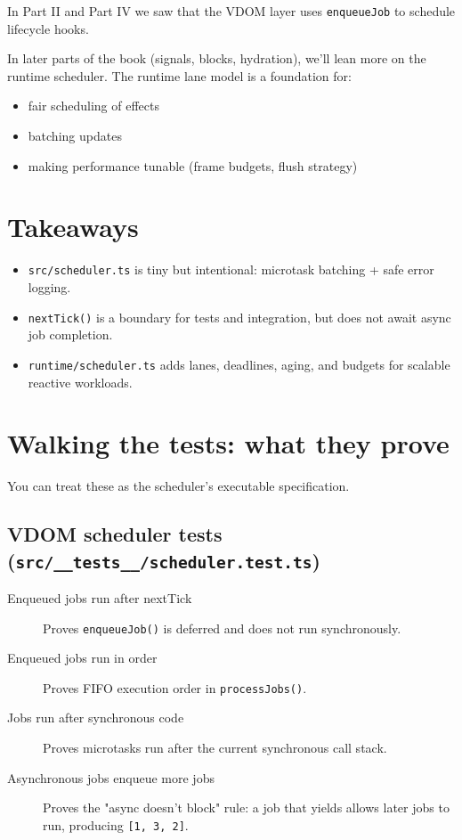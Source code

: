 In Part II and Part IV we saw that the VDOM layer uses \texttt{enqueueJob} to schedule lifecycle hooks.

In later parts of the book (signals, blocks, hydration), we’ll lean more on the runtime scheduler.
The runtime lane model is a foundation for:

\begin{itemize}
  \item fair scheduling of effects
  \item batching updates
  \item making performance tunable (frame budgets, flush strategy)
\end{itemize}

\section{Takeaways}

\begin{itemize}
  \item \texttt{src/scheduler.ts} is tiny but intentional: microtask batching + safe error logging.
  \item \texttt{nextTick()} is a boundary for tests and integration, but does not await async job completion.
  \item \texttt{runtime/scheduler.ts} adds lanes, deadlines, aging, and budgets for scalable reactive workloads.
\end{itemize}

\section{Walking the tests: what they prove}

You can treat these as the scheduler’s executable specification.

\subsection{VDOM scheduler tests (\texttt{src/\_\_tests\_\_/scheduler.test.ts})}

\begin{description}
  \item[Enqueued jobs run after nextTick] Proves \texttt{enqueueJob()} is deferred and does not run synchronously.
  \item[Enqueued jobs run in order] Proves FIFO execution order in \texttt{processJobs()}.
  \item[Jobs run after synchronous code] Proves microtasks run after the current synchronous call stack.
  \item[Asynchronous jobs enqueue more jobs] Proves the "async doesn’t block" rule: a job that yields allows later jobs to run, producing \texttt{[1, 3, 2]}.
\end{description}

